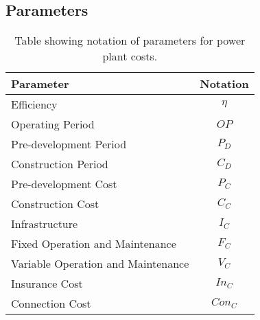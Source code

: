 
\clearpage
\subsection{Parameters}


\begin{table}[h]
	\begin{tabular}{|l|c|}
		\hline
		\textbf{Parameter} & \textbf{Notation} \\ \hline
		Efficiency & $\eta$ \\ \hline
		Operating Period & $OP$ \\ \hline
		Pre-development Period & $P_D$ \\ \hline
		Construction Period & $C_D$ \\ \hline
		Pre-development Cost & $P_C$ \\ \hline
		Construction Cost & $C_C$ \\ \hline
		Infrastructure & $I_C$ \\ \hline
		Fixed Operation and Maintenance & $F_C$ \\ \hline
		Variable Operation and Maintenance & $V_C$ \\ \hline
		Insurance Cost & $In_C$ \\ \hline
		Connection Cost & $Con_C$ \\ \hline
	\end{tabular}
	\caption{Table showing notation of parameters for power plant costs.}
	\label{table:parameter_notation_table}
\end{table}


